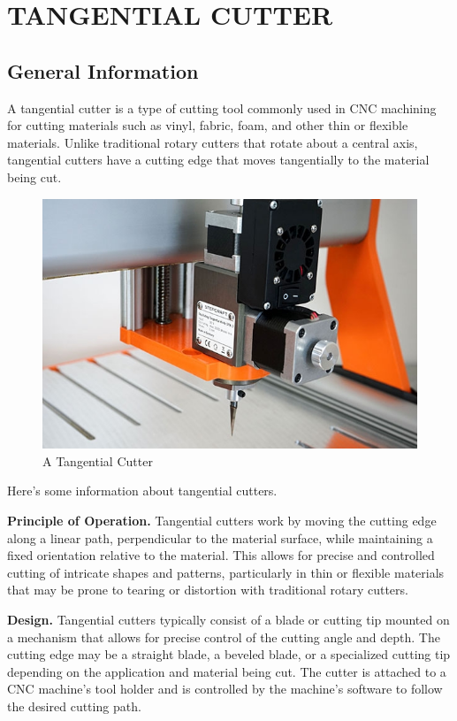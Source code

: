 \chapter{TANGENTIAL CUTTER}


\section{General Information}

A tangential cutter is a type of cutting tool commonly used in CNC machining
for cutting materials such as vinyl, fabric, foam, and other thin or flexible materials.
Unlike traditional rotary cutters that rotate about a central axis,
tangential cutters have a cutting edge that moves tangentially to the material being cut.

\begin{figure}[h!tb]
\centering
\includegraphics[scale=0.80]{otc.jpg}
\caption{A Tangential Cutter}
\label{fig:label3}
\end{figure}


Here's some information about tangential cutters.

\noindent\textbf{Principle of Operation.}
Tangential cutters work by moving the cutting edge along a linear path, perpendicular to the material surface, while maintaining a fixed orientation relative to the material.
This allows for precise and controlled cutting of intricate shapes and patterns, particularly in thin or flexible materials that may be prone to tearing or distortion with traditional rotary cutters.

\noindent\textbf{Design.}
Tangential cutters typically consist of a blade or cutting tip mounted on a mechanism that allows for precise control of the cutting angle and depth.
The cutting edge may be a straight blade, a beveled blade, or a specialized cutting tip depending on the application and material being cut.
The cutter is attached to a CNC machine's tool holder and is controlled by the machine's software to follow the desired cutting path.

